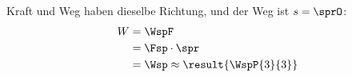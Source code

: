 Kraft und Weg haben dieselbe Richtung, und der Weg ist $s = \sprO$:
\begin{align}
 W &= \WspF \\
   &= \Fsp\cdot\spr \\
   &= \Wsp \approx \result{\WspP{3}{3}}
\end{align}
